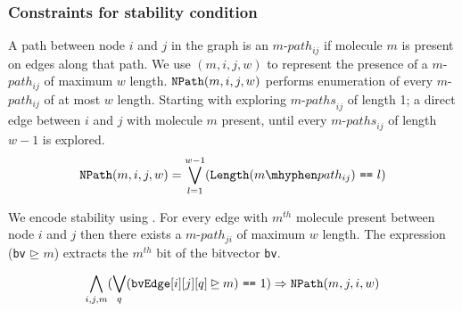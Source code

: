 \subsubsection{Constraints for stability condition}
%
A path between node $i$ and $j$ in the graph is an $m$-$path_{ij}$ if molecule $m$ is present on edges along that path.
%
%
We use {\npath}$(m, i, j, w)$ to represent the presence of a $m$-$path_{ij}$ of maximum $w$ length.
%
%
$\texttt{NPath}(m, i, j, w)$ performs enumeration of every $m$-$path_{ij}$ of at most $w$ length. 
%
Starting with exploring $m$-${paths}_{ij}$ of length 1; a direct edge between $i$ and $j$ with molecule $m$ present, until every $m$-${paths}_{ij}$ of length $w-1$ is explored.
%
%
\begin{align*}
\npath(m, i, j, w) = \bigvee\limits_{l = 1}^{w-1} (\texttt{Length} (m \mhyphen path_{ij})~\texttt{=}\texttt{=}~l)
\end{align*}

We encode stability using \npath. For every edge with $m^{th}$ molecule present between node $i$ and $j$ then there exists a $m$-$path_{ji}$ of maximum $w$ length.
%
The expression (\texttt{bv} $\unrhd$ $m$) extracts the $m^{th}$ bit of the bitvector \texttt{bv}. 

\begin{align*}
	\bigwedge\limits_{i,j,m} (\bigvee_{q} (\texttt{bvEdge}[i][j][q] \unrhd m)~\texttt{=}\texttt{=}~1) \Rightarrow \texttt{NPath}(m, j, i, w)
\end{align*}

